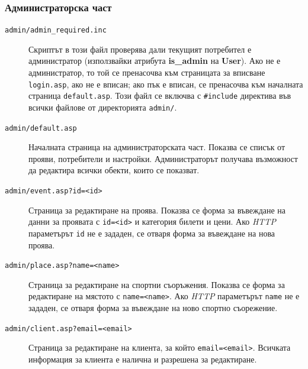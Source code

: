 \documentclass[a4paper,10pt, leqno]{article}
\newcommand{\term}[1] {\textsl{#1}}
\newcommand{\tab}[1] {\textbf{#1}}
\newcommand{\col}[1] {\textbf{#1}}
\newcommand{\File}[1] {\texttt{#1}}
\begin{document}
    \subsubsection{Администраторска част}
    \begin{description}
        \item[\File{admin/admin\_required.inc}]
            Скриптът в този файл проверява дали текущият потребител е администратор (използвайки атрибута \col{is\_admin} на \tab{User}).
            Ако не е администратор, то той се пренасочва към страницата
            за вписване \File{login.asp}, ако не е вписан; ако пък е вписан, се пренасочва към началната страница \File{default.asp}.
            Този файл се включва с \texttt{\#include} директива във всички файлове от директорията \File{admin/}.
        \item[\File{admin/default.asp}]
            Началната страница на администраторската част. Показва се списък от прояви, потребители и настройки.
            Администраторът получава възможност да редактира всички обекти, които се показват.
        \item[\File{admin/event.asp?id=<id>}]
            Страница за редактиране на проява. Показва се форма за въвеждане на данни за проявата с \texttt{id=<id>} и категория билети и цени.
            Ако \term{HTTP} параметърът \texttt{id} не е зададен, се отваря форма за въвеждане на нова проява.
        \item[\File{admin/place.asp?name=<name>}]
            Страница за редактиране на спортни съоръжения. Показва се форма за редактиране на мястото с \texttt{name=<name>}.
            Ако \term{HTTP} параметърът \texttt{name} не е зададен, се отваря форма за въвеждане на ново спортно съорежение.
        \item[\File{admin/client.asp?email=<email>}]
            Страница за редактиране на клиента, за който \texttt{email=<email>}.
            Всичката информация за клиента е налична и разрешена за редактиране.
    \end{description}
\end{document}
